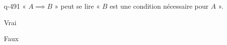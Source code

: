 \begin{truefalse}{q-491}
« $A \implies B$ » peut se lire « $B$ est une condition nécessaire pour $A$ ».
\item* Vrai
\item Faux
\end{truefalse}

